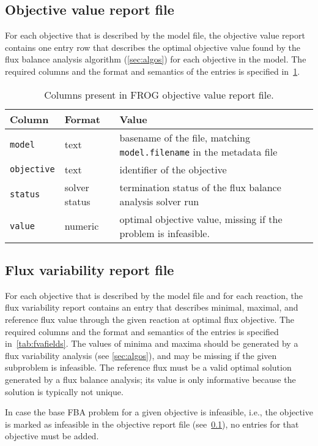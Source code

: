 \subsection{Objective value report file}
\label{sec:obj}

For each objective that is described by the model file, the objective value report contains one entry row that describes the optimal objective value found by the flux balance analysis algorithm (\cref{sec:algos}) for each objective in the model. The required columns and the format and semantics of the entries is specified in~\cref{tab:objfields}.

\begin{table}\tablefont
\begin{tabular}{llp{30em}}
\toprule
Column & Format & Value \\
\midrule
\verb|model|
 & text
 & basename of the file, matching \verb|model.filename| in the metadata file
 \\
\verb|objective|
 & text
 & identifier of the objective
 \\
\verb|status|
 & solver status
 & termination status of the flux balance analysis solver run
 \\
\verb|value|
 & numeric
 & optimal objective value, missing if the problem is infeasible.
 \\
\bottomrule
\end{tabular}
\caption{Columns present in FROG objective value report file.}
\label{tab:objfields}
\end{table}

\subsection{Flux variability report file}
\label{sec:fva}
For each objective that is described by the model file and for each reaction, the flux variability report contains an entry that describes minimal, maximal, and reference flux value through the given reaction at optimal flux objective. The required columns and the format and semantics of the entries is specified in~\cref{tab:fvafields}. The values of minima and maxima should be generated by a flux variability analysis (see \cref{sec:algos}), and may be missing if the given subproblem is infeasible. The reference flux must be a valid optimal solution generated by a flux balance analysis; its value is only informative because the solution is typically not unique.

In case the base FBA problem for a given objective is infeasible, i.e., the objective is marked as infeasible in the objective report file (see~\cref{sec:obj}), no entries for that objective must be added.

